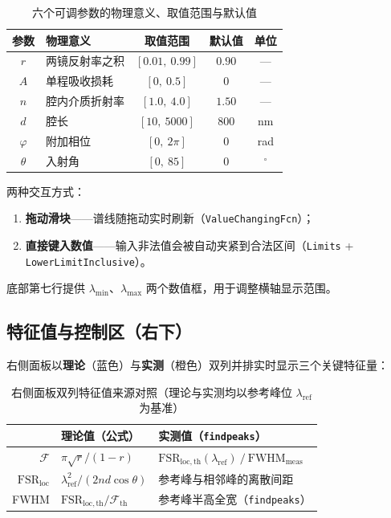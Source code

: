 \documentclass[10.5pt]{config}
\begin{document}
\begin{table}[H]
    \centering
    \caption{六个可调参数的物理意义、取值范围与默认值}
    \label{tab:params}
    \begin{tabular}{clccc}
        \toprule
        参数 & 物理意义 & 取值范围 & 默认值 & 单位 \\
        \midrule
        $r$         & 两镜反射率之积     & $[0.01,\ 0.99]$ & $0.90$ & --- \\
        $A$         & 单程吸收损耗       & $[0,\ 0.5]$     & $0$    & --- \\
        $n$         & 腔内介质折射率     & $[1.0,\ 4.0]$   & $1.50$ & --- \\
        $d$         & 腔长               & $[10,\ 5000]$   & $800$  & \si{nm} \\
        $\varphi$   & 附加相位           & $[0,\ 2\pi]$    & $0$    & rad \\
        $\theta$    & 入射角             & $[0,\ 85]$      & $0$    & $^\circ$ \\
        \bottomrule
    \end{tabular}
\end{table}

两种交互方式：
\begin{enumerate}
    \item \textbf{拖动滑块}——谱线随拖动实时刷新（\texttt{ValueChangingFcn}）；
    \item \textbf{直接键入数值}——输入非法值会被自动夹紧到合法区间（\texttt{Limits} + \texttt{LowerLimitInclusive}）。
\end{enumerate}

底部第七行提供 $\lambda_{\min}$、$\lambda_{\max}$ 两个数值框，用于调整横轴显示范围。

\subsection{特征值与控制区（右下）}

右侧面板以\textbf{理论}（蓝色）与\textbf{实测}（橙色）双列并排实时显示三个关键特征量：

\begin{table}[H]
    \centering
    \footnotesize
    \begin{tabular}{r l l}
        \toprule
         & 理论值（公式） & 实测值（\texttt{findpeaks}） \\
        \midrule
        $\mathcal{F}$ & $\pi\sqrt{r}/(1-r)$ & $\mathrm{FSR}_{\mathrm{loc,th}}(\lambda_\text{ref})~/~\mathrm{FWHM}_\text{meas}$ \\
        $\mathrm{FSR}_\mathrm{loc}$ & $\lambda_\text{ref}^{2}/(2nd\cos\theta)$ & 参考峰与相邻峰的离散间距 \\
        FWHM & $\mathrm{FSR}_{\mathrm{loc,th}}/\mathcal{F}_{\mathrm{th}}$ & 参考峰半高全宽（\texttt{findpeaks}） \\
        \bottomrule
    \end{tabular}
    \caption{右侧面板双列特征值来源对照（理论与实测均以参考峰位 $\lambda_\text{ref}$ 为基准）}
\end{table}
\end{document}
